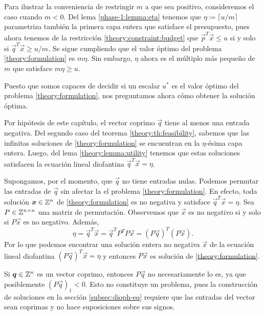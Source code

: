 \begin{observation}
	Para ilustrar la conveniencia de restringir $m$ a que sea positivo, consideremos el caso cuando
	$m < 0$. Del lema \ref{phase-1:lemma:eta} tenemos que $\eta \coloneq \lceil u/m \rceil$
	parametriza también la primera capa entera que satisface el presupuesto, pues ahora tenemos de
	la restricción \eqref{theory:constraint:budget} que $\vec{p}^T\vec{x} \leq u$ si y solo si
	$\vec{q}^T\vec{x} \geq u/m$. Se sigue cumpliendo que el valor óptimo del problema
	\eqref{theory:formulation} es $m\eta$. Sin embargo, $\eta$ ahora es el múltiplo más pequeño de $m$
	que satisface $m\eta \geq u$.
\end{observation}

Puesto que somos capaces de decidir si un escalar $u^*$ es el valor óptimo del problema
\eqref{theory:formulation}, nos preguntamos ahora cómo obtener la solución óptima.

Por hipótesis de este capítulo, el vector coprimo $\vec{q}$ tiene al menos una entrada negativa. Del
segundo caso del teorema \ref{theory:th:feasibility}, sabemos que las infinitas soluciones de
\eqref{theory:formulation} se encuentran en la $\eta$-ésima capa entera. Luego, del lema
\ref{theory:lemma:utility} tenemos que estas soluciones satisfacen la ecuación lineal diofantina
$\vec{q}^T\vec{x} = \eta$.

Supongamos, por el momento, que $\vec{q}$ no tiene entradas nulas. Podemos permutar las entradas de
$\vec{q}$ sin afectar la el problema \eqref{theory:formulation}. En efecto, toda solución $\boldsymbol{x}
\in \mathbb{Z}^n$ de \eqref{theory:formulation} es no negativa y satisface $\vec{q}^T\vec{x} = \eta$. Sea $P
\in \mathbb{Z}^{n \times n}$ una matriz de permutación. Observemos que $\vec{x}$ es no negativo si y solo si
$P\vec{x}$ es no negativo. Además,
\begin{equation*}
	\eta = \vec{q}^T\vec{x} = \vec{q}^TP^TP\vec{x} = (P\vec{q})^T(P\vec{x}).
\end{equation*}
Por lo que podemos encontrar una solución entera no negativa $\vec{x}$ de la ecuación lineal
diofantina $(P\vec{q})^T\vec{x} = \eta$ y entonces $P\vec{x}$ es solución de
\eqref{theory:formulation}.

\begin{observation}
	Si $\boldsymbol{q} \in \mathbb{Z}^n$ es un vector coprimo, entonces $P\vec{q}$ no necesariamente lo es, ya que
	posiblemente $(P\vec{q})_1 < 0$. Esto no constituye un problema, pues la construcción de soluciones
	en la sección \ref{subsec:dioph-eq} requiere que las entradas del vector sean coprimas y no hace
	suposiciones sobre sus signos.
\end{observation}


